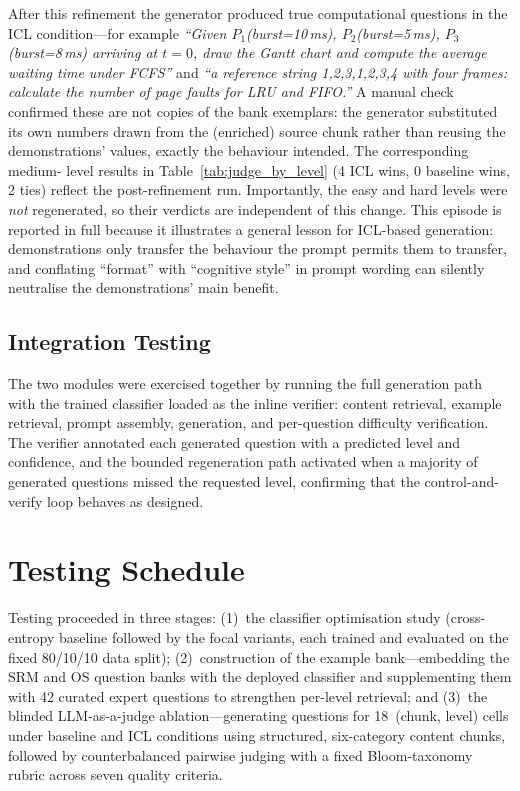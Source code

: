 \documentclass[12pt,a4paper]{report}
\begin{document}
After this refinement the generator produced true computational questions in the
ICL condition---for example \emph{``Given $P_1$(burst=10\,ms), $P_2$(burst=5\,ms),
$P_3$(burst=8\,ms) arriving at $t=0$, draw the Gantt chart and compute the average
waiting time under FCFS''} and \emph{``a reference string 1,2,3,1,2,3,4 with four
frames: calculate the number of page faults for LRU and FIFO.''} A manual check
confirmed these are not copies of the bank exemplars: the generator substituted
its own numbers drawn from the (enriched) source chunk rather than reusing the
demonstrations' values, exactly the behaviour intended. The corresponding medium-
level results in Table~\ref{tab:judge_by_level} (4 ICL wins, 0 baseline wins,
2 ties) reflect the post-refinement run. Importantly, the easy and hard levels
were \emph{not} regenerated, so their verdicts are independent of this change.
This episode is reported in full because it illustrates a general lesson for
ICL-based generation: demonstrations only transfer the behaviour the prompt
permits them to transfer, and conflating ``format'' with ``cognitive style'' in
prompt wording can silently neutralise the demonstrations' main benefit.

\subsection{Integration Testing}
The two modules were exercised together by running the full generation path with
the trained classifier loaded as the inline verifier: content retrieval, example
retrieval, prompt assembly, generation, and per-question difficulty verification.
The verifier annotated each generated question with a predicted level and
confidence, and the bounded regeneration path activated when a majority of
generated questions missed the requested level, confirming that the
control-and-verify loop behaves as designed.

\section{Testing Schedule}
Testing proceeded in three stages: (1)~the classifier optimisation study
(cross-entropy baseline followed by the focal variants, each trained and
evaluated on the fixed 80/10/10 data split); (2)~construction of the example
bank---embedding the SRM and OS question banks with the deployed classifier and
supplementing them with 42 curated expert questions to strengthen per-level
retrieval; and (3)~the blinded LLM-as-a-judge ablation---generating questions
for 18~(chunk, level) cells under baseline and ICL conditions using structured,
six-category content chunks, followed by counterbalanced pairwise judging with a
fixed Bloom-taxonomy rubric across seven quality criteria.
\end{document}
